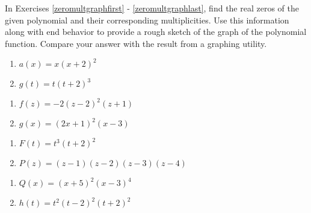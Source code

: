 \documentclass{ximera}
\begin{document}
\label{polygraphexercise}

In Exercises \ref{zeromultgraphfirst} - \ref{zeromultgraphlast}, find the real zeros of the given polynomial and their corresponding multiplicities.  Use this information along with end behavior to provide a rough sketch of the graph of the polynomial function.  Compare your answer with the result from a graphing utility.

\begin{multicols}{2}
\begin{enumerate}
\setcounter{enumi}{\value{HW}}

\item $a(x) = x(x + 2)^{2}$ \label{zeromultgraphfirst}
\item $g(t) = t(t + 2)^{3}$

\setcounter{HW}{\value{enumi}}
\end{enumerate}
\end{multicols}


\begin{multicols}{2}
\begin{enumerate}
\setcounter{enumi}{\value{HW}}

\item $f(z) = -2(z-2)^2(z+1)$
\item $g(x) = (2x+1)^2(x-3)$

\setcounter{HW}{\value{enumi}}
\end{enumerate}
\end{multicols}


\begin{multicols}{2}
\begin{enumerate}
\setcounter{enumi}{\value{HW}}

\item $F(t) = t^{3}(t+ 2)^{2}$
\item $P(z) = (z- 1)(z - 2)(z - 3)(z - 4)$

\setcounter{HW}{\value{enumi}}
\end{enumerate}
\end{multicols}


\begin{multicols}{2}
\begin{enumerate}
\setcounter{enumi}{\value{HW}}

\item $Q(x) = (x + 5)^{2}(x - 3)^{4}$
\item $h(t) = t^2(t-2)^2(t+2)^2$

\setcounter{HW}{\value{enumi}}
\end{enumerate}
\end{multicols}
\end{document}
